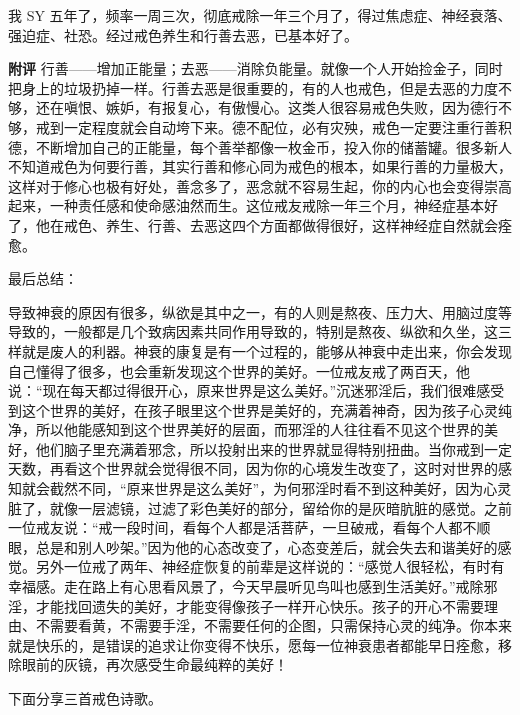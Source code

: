 \begin{case}[神经衰弱]
    我 SY 五年了，频率一周三次，彻底戒除一年三个月了，得过焦虑症、神经衰落、强迫症、社恐。经过戒色养生和行善去恶，已基本好了。

    \textbf{附评} 行善——增加正能量；去恶——消除负能量。就像一个人开始捡金子，同时把身上的垃圾扔掉一样。行善去恶是很重要的，有的人也戒色，但是去恶的力度不够，还在嗔恨、嫉妒，有报复心，有傲慢心。这类人很容易戒色失败，因为德行不够，戒到一定程度就会自动垮下来。德不配位，必有灾殃，戒色一定要注重行善积德，不断增加自己的正能量，每个善举都像一枚金币，投入你的储蓄罐。很多新人不知道戒色为何要行善，其实行善和修心同为戒色的根本，如果行善的力量极大，这样对于修心也极有好处，善念多了，恶念就不容易生起，你的内心也会变得崇高起来，一种责任感和使命感油然而生。这位戒友戒除一年三个月，神经症基本好了，他在戒色、养生、行善、去恶这四个方面都做得很好，这样神经症自然就会痊愈。
\end{case}

最后总结：

导致神衰的原因有很多，纵欲是其中之一，有的人则是熬夜、压力大、用脑过度等导致的，一般都是几个致病因素共同作用导致的，特别是熬夜、纵欲和久坐，这三样就是废人的利器。神衰的康复是有一个过程的，能够从神衰中走出来，你会发现自己懂得了很多，也会重新发现这个世界的美好。一位戒友戒了两百天，他说：“现在每天都过得很开心，原来世界是这么美好。”沉迷邪淫后，我们很难感受到这个世界的美好，在孩子眼里这个世界是美好的，充满着神奇，因为孩子心灵纯净，所以他能感知到这个世界美好的层面，而邪淫的人往往看不见这个世界的美好，他们脑子里充满着邪念，所以投射出来的世界就显得特别扭曲。当你戒到一定天数，再看这个世界就会觉得很不同，因为你的心境发生改变了，这时对世界的感知就会截然不同，“原来世界是这么美好”，为何邪淫时看不到这种美好，因为心灵脏了，就像一层滤镜，过滤了彩色美好的部分，留给你的是灰暗肮脏的感觉。之前一位戒友说：“戒一段时间，看每个人都是活菩萨，一旦破戒，看每个人都不顺眼，总是和别人吵架。”因为他的心态改变了，心态变差后，就会失去和谐美好的感觉。另外一位戒了两年、神经症恢复的前辈是这样说的：“感觉人很轻松，有时有幸福感。走在路上有心思看风景了，今天早晨听见鸟叫也感到生活美好。”戒除邪淫，才能找回遗失的美好，才能变得像孩子一样开心快乐。孩子的开心不需要理由、不需要看黄，不需要手淫，不需要任何的企图，只需保持心灵的纯净。你本来就是快乐的，是错误的追求让你变得不快乐，愿每一位神衰患者都能早日痊愈，移除眼前的灰镜，再次感受生命最纯粹的美好！

下面分享三首戒色诗歌。

